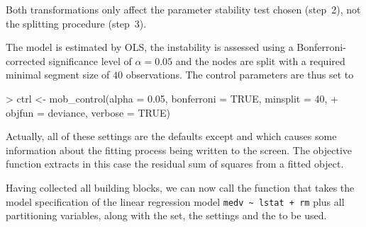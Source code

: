 \documentclass{Z}
\begin{document}
Both transformations only affect the parameter stability test chosen (step~2), not the splitting
procedure (step~3).

The model is estimated
by OLS, the instability is assessed using a Bonferroni-corrected
significance level of $\alpha = 0.05$ and the nodes are split with a required minimal
segment size of $40$ observations. The control parameters are thus set to

\begin{Schunk}
\begin{Sinput}
> ctrl <- mob_control(alpha = 0.05, bonferroni = TRUE, minsplit = 40, 
+     objfun = deviance, verbose = TRUE)
\end{Sinput}
\end{Schunk}

Actually, all of these settings are the defaults except  and
 which causes some information about the fitting process
being written to the screen. The objective function  extracts in
this case the residual sum of squares from a fitted  object.

Having collected all building blocks, we can now call the function 
that takes the model specification of the linear regression model \verb:medv ~ lstat + rm:
plus all partitioning variables, along with the  set, the 
settings and the  to be used.
\end{document}
